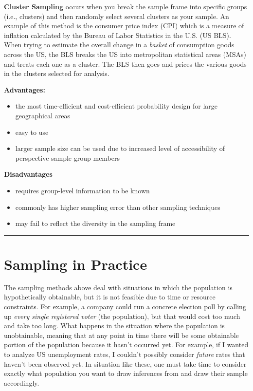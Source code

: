 \documentclass[
]{book}
\begin{document}
\textbf{Cluster Sampling} occurs when you break the sample frame into specific groups (i.e., clusters) and then randomly select several clusters as your sample. An example of this method is the consumer price index (CPI) which is a measure of inflation calculated by the Bureau of Labor Statistics in the U.S. (US BLS). When trying to estimate the overall change in a \emph{basket} of consumption goods across the US, the BLS breaks the US into metropolitan statistical areas (MSAs) and treats each one as a cluster. The BLS then goes and prices the various goods in the clusters selected for analysis.

\textbf{Advantages:}

\begin{itemize}
\item
  the most time-efficient and cost-efficient probability design for large geographical areas
\item
  easy to use
\item
  larger sample size can be used due to increased level of accessibility of perspective sample group members
\end{itemize}

\textbf{Disadvantages}

\begin{itemize}
\item
  requires group-level information to be known
\item
  commonly has higher sampling error than other sampling techniques
\item
  may fail to reflect the diversity in the sampling frame
\end{itemize}

\begin{center}\rule{0.5\linewidth}{0.5pt}\end{center}

\hypertarget{sampling-in-practice}{%
\section{Sampling in Practice}\label{sampling-in-practice}}

The sampling methods above deal with situations in which the population is hypothetically obtainable, but it is not feasible due to time or resource constraints. For example, a company could run a concrete election poll by calling up \emph{every single registered voter} (the population), but that would cost too much and take too long. What happens in the situation where the population is unobtainable, meaning that at any point in time there will be some obtainable portion of the population because it hasn't occurred yet. For example, if I wanted to analyze US unemployment rates, I couldn't possibly consider \emph{future} rates that haven't been observed yet. In situation like these, one must take time to consider exactly what population you want to draw inferences from and draw their sample accordingly.
\end{document}
